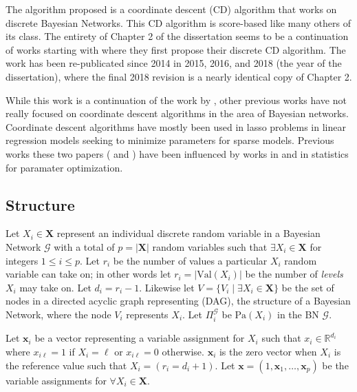 \documentclass[twoside,11pt]{article}
\let\mc\mathcal
\let\mbf\mathbf
\let\bb\mathbb
\begin{document}

The algorithm proposed is a coordinate descent (CD) algorithm that works on discrete Bayesian Networks. This CD algorithm is score-based like many others of its class. The entirety of Chapter 2 of the dissertation seems to be a continuation of works starting with \citep{gu2014penalized} where they first propose their discrete CD algorithm. The work has been re-publicated since 2014 in 2015, 2016, and 2018 (the year of the dissertation), where the final 2018 revision is a nearly identical copy of Chapter 2.

While this work is a continuation of the work by \citeauthor{zhou}, other previous works have not really focused on coordinate descent algorithms in the area of Bayesian networks. Coordinate descent algorithms have mostly been used in lasso problems in linear regression models seeking to minimize parameters for sparse models. Previous works these two papers (\cite{zhou} and \cite{gu2014penalized}) have been influenced by works in \cite{friedman2007} and \cite{wu2008coordinate} in statistics for paramater optimization.



\subsection{Structure}

Let $X_i\in\mbf{X}$ represent an individual discrete random variable in a Bayesian Network $\mc{G}$ with a total of $p=|\mbf{X}|$ random variables such that $\exists X_i\in\mbf{X}$ for integers $1\leq{i}\leq p$. Let $r_i$ be the number of values a particular $X_i$ random variable can take on; in other words let $r_i=\lvert \text{Val}(X_i)\rvert$ be the number of \textit{levels} $X_i$ may take on. Let $d_i=r_i-1$. Likewise let $V=\{V_i \mid \exists X_i\in\mbf{X}\}$ be the set of nodes in a directed acyclic graph representing (DAG), the structure of a Bayesian Network, where the node $V_i$ represents $X_i$. Let $\Pi^\mathcal{G}_i$ be $\text{Pa}(X_i)$ in the BN $\mc{G}$.

Let $\mbf x_i$ be a vector representing a variable assignment for $X_i$ such that $x_i\in\bb{R}^{d_i}$ where $x_{i\ell}=1$ if $X_i=\ell$ or $x_{i\ell}=0$ otherwise. $\mbf x_i$ is the zero vector when $X_i$ is the reference value such that $X_i = (r_i = d_i+1)$. Let $\mbf x=(1,\mbf x_1,\dots,\mbf x_p)$ be the variable assignments for $\forall X_i \in \mbf{X}$.
\end{document}

